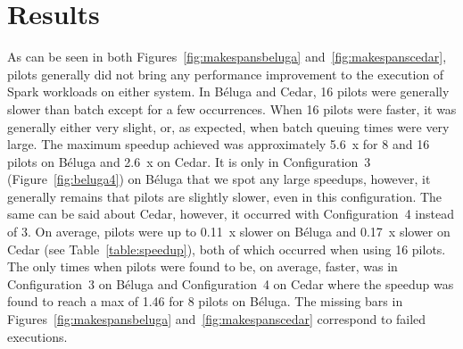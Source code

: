     
    
    \section{Results}\label{spa:sec:results}
    
    As can be seen in both Figures~\ref{fig:makespansbeluga} and~\ref{fig:makespanscedar}, pilots 
    generally did not bring any performance improvement to the execution of Spark workloads
    on either system. In B\'eluga and Cedar, 16 pilots were generally slower than batch except for a 
    few occurrences. When 16 pilots were faster, it was generally either very slight, or, as expected,
    when batch queuing times were very large. The maximum speedup achieved
    was approximately 5.6~x for 8 and 16 pilots on B\'eluga and 2.6~x on Cedar. 
    It is only in Configuration~3 (Figure~\ref{fig:beluga4}) on B\'eluga
    that we spot any large speedups, however, it generally remains that
    pilots are slightly slower, even in this configuration. The same can be said about Cedar, however,
    it occurred with Configuration~4 instead of 3. On average, pilots were up to 0.11~x slower on B\'eluga and
    0.17~x slower on Cedar (see Table~\ref{table:speedup}), both of which occurred when using 16 pilots.
    The only times when pilots were found to be, on average, faster, was in Configuration~3 on B\'eluga
    and Configuration~4 on Cedar where the speedup was found to reach a max of 1.46 for 8 pilots on 
    B\'eluga. The missing bars in Figures~\ref{fig:makespansbeluga} and~\ref{fig:makespanscedar} correspond to 
    failed executions.
    
